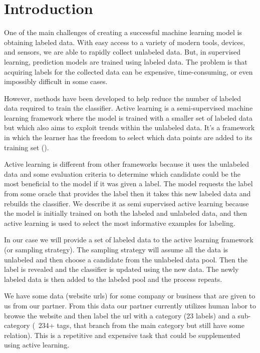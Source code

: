 \chapter*{Introduction}

One of the main challenges of creating a successful machine learning model is obtaining labeled data. With easy access to a variety of modern tools, devices, and sensors, we are able to rapidly collect unlabeled data. But, in supervised learning, prediction models are trained using labeled data. The problem is that acquiring labels for the collected data can be expensive, time-consuming, or even impossibly difficult in some cases.  

However, methods have been developed to help reduce the number of labeled data required to train the classifier. Active learning is a semi-supervised machine learning framework where the model is trained with a smaller set of labeled data but which also aims to exploit trends within the unlabeled data. It's a framework in which the learner has the freedom to select which data points are added to its training set (\cite{roy2001eer}). 

Active learning is different from other frameworks because it uses the unlabeled data and some evaluation criteria to determine which candidate could be the most beneficial to the model if it was given a label. The model requests the label from some oracle that provides the label then it takes this new labeled data and rebuilds the classifier. We describe it as semi supervised active learning because the model is initially trained on both the labeled and unlabeled data, and then active learning is used to select the most informative examples for labeling.

In our case we will provide a set of labeled data to the active learning framework (or sampling strategy). The sampling strategy will assume all the data is unlabeled and then choose a candidate from the unlabeled data pool. Then the label is revealed and the classifier is updated using the new data. The newly labeled data is then added to the labeled pool and the process repeats.

We have some data (website urls) for some company or business that are given to us from our partner. From this data our partner currently utilizes human labor to browse the website and then label the url with a category (23 labels) and a sub-category (~234+ tags, that branch from the main category but still have some relation). This is a repetitive and expensive task that could be supplemented using active learning.

